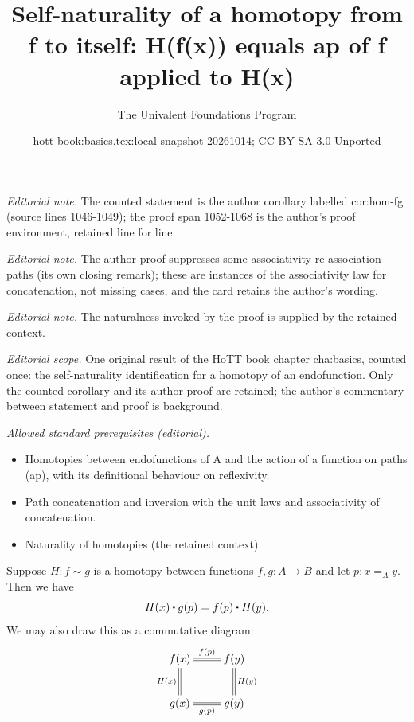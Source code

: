 \documentclass[10pt,a4paper]{article}
\title{Self-naturality of a homotopy from f to itself: H(f(x)) equals ap of f applied to H(x)}
\author{The Univalent Foundations Program}
\date{hott-book:basics.tex:local-snapshot-20261014; CC BY-SA 3.0 Unported}
\newcounter{chapter}
\providecommand{\index}[1]{}
\newcommand{\id}[3][]{\ensuremath{#2 =_{#1} #3}\xspace}
\newcommand{\ct}{%
  \mathchoice{\mathbin{\raisebox{0.5ex}{$\displaystyle\centerdot$}}}%
             {\mathbin{\raisebox{0.5ex}{$\centerdot$}}}%
             {\mathbin{\raisebox{0.25ex}{$\scriptstyle\,\centerdot\,$}}}%
             {\mathbin{\raisebox{0.1ex}{$\scriptscriptstyle\,\centerdot\,$}}}
}
\newcommand{\map}[2]{\ensuremath{{#1}\mathopen{}\left({#2}\right)\mathclose{}}\xspace}
\let\ap\map
\newcommand{\htpy}{\sim}
\theoremstyle{definition}
\theoremstyle{remark}
\numberwithin{equation}{section}
\begin{document}
\maketitle
\noindent\textit{Editorial note.} The counted statement is the author corollary labelled cor:hom-fg (source lines 1046-1049); the proof span 1052-1068 is the author's proof environment, retained line for line.\par\medskip
\noindent\textit{Editorial note.} The author proof suppresses some associativity re-association paths (its own closing remark); these are instances of the associativity law for concatenation, not missing cases, and the card retains the author's wording.\par\medskip
\noindent\textit{Editorial note.} The naturalness invoked by the proof is supplied by the retained context.\par\medskip
\noindent\textit{Editorial scope.} One original result of the HoTT book chapter cha:basics, counted once: the self-naturality identification for a homotopy of an endofunction. Only the counted corollary and its author proof are retained; the author's commentary between statement and proof is background.\par\medskip
\noindent\textit{Allowed standard prerequisites (editorial).}\begin{itemize}
\item Homotopies between endofunctions of A and the action of a function on paths (ap), with its definitional behaviour on reflexivity.
\item Path concatenation and inversion with the unit laws and associativity of concatenation.
\item Naturality of homotopies (the retained context).
\end{itemize}\medskip
\begin{lem}\label{lem:htpy-natural}
  Suppose $H:f\htpy g$ is a homotopy between functions $f,g:A\to B$ and let $p:\id[A]xy$.  Then we have
  \begin{equation*}
    H(x)\ct\ap{g}{p}=\ap{f}{p}\ct H(y).
  \end{equation*}
  We may also draw this as a commutative diagram:\index{diagram}
  \begin{align*}
    \xymatrix{
      f(x) \ar@{=}[r]^{\ap fp} \ar@{=}[d]_{H(x)} & f(y) \ar@{=}[d]^{H(y)} \\
      g(x) \ar@{=}[r]_{\ap gp} & g(y)
    }
  \end{align*}
\end{lem}
\end{document}
